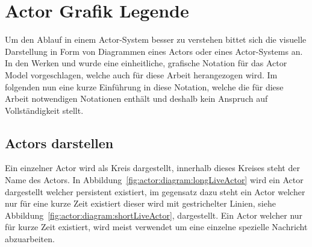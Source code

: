 \section{Actor Grafik Legende}\label{actor:diagram:description}
Um den Ablauf in einem Actor-System besser zu verstehen bittet sich die visuelle Darstellung in Form von Diagrammen eines Actors oder eines Actor-Systems an. In den Werken \cite{kuhn2017reactive} und \cite{Vernon2015ReactiveAkka} wurde eine einheitliche, grafische Notation für das Actor Model vorgeschlagen, welche auch für diese Arbeit herangezogen wird. Im folgenden nun eine kurze Einführung in diese Notation, welche die für diese Arbeit notwendigen Notationen enthält und deshalb kein Anspruch auf Vollständigkeit stellt.\\
\subsection{Actors darstellen}
Ein einzelner Actor wird als Kreis dargestellt, innerhalb dieses Kreises steht der Name des Actors. In Abbildung~\ref{fig:actor:diagram:longLiveActor} wird ein Actor dargestellt welcher persistent existiert, im gegensatz dazu steht ein Actor welcher nur für eine kurze Zeit existiert dieser wird mit gestrichelter Linien, siehe Abbildung~\ref{fig:actor:diagram:shortLiveActor}, dargestellt. Ein Actor welcher nur für kurze Zeit existiert, wird meist verwendet um eine einzelne spezielle Nachricht abzuarbeiten.
